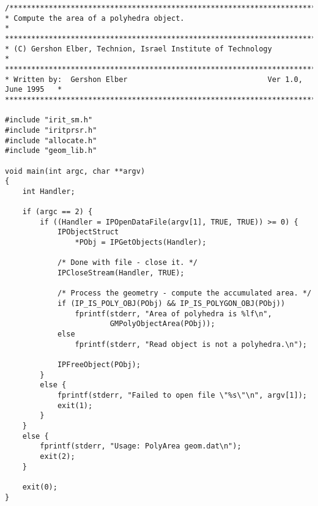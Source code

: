 \begin{verbatim}
/*****************************************************************************
* Compute the area of a polyhedra object.                                     *
******************************************************************************
* (C) Gershon Elber, Technion, Israel Institute of Technology                *
******************************************************************************
* Written by:  Gershon Elber                                Ver 1.0, June 1995   *
*****************************************************************************/

#include "irit_sm.h"
#include "iritprsr.h"
#include "allocate.h"
#include "geom_lib.h"

void main(int argc, char **argv)
{
    int Handler;

    if (argc == 2) {
        if ((Handler = IPOpenDataFile(argv[1], TRUE, TRUE)) >= 0) {
            IPObjectStruct
                *PObj = IPGetObjects(Handler);

            /* Done with file - close it. */
            IPCloseStream(Handler, TRUE);

            /* Process the geometry - compute the accumulated area. */
            if (IP_IS_POLY_OBJ(PObj) && IP_IS_POLYGON_OBJ(PObj))
                fprintf(stderr, "Area of polyhedra is %lf\n",
                        GMPolyObjectArea(PObj));
            else
                fprintf(stderr, "Read object is not a polyhedra.\n");

            IPFreeObject(PObj);
        }
        else {
            fprintf(stderr, "Failed to open file \"%s\"\n", argv[1]);
            exit(1);
        }
    }
    else {
        fprintf(stderr, "Usage: PolyArea geom.dat\n");
        exit(2);
    }

    exit(0);
}
\end{verbatim}
